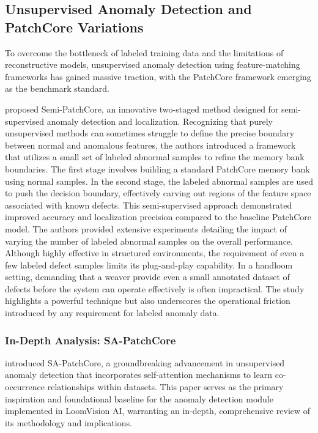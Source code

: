 \documentclass{ieeeaccess}
\begin{document}
\subsection{Unsupervised Anomaly Detection and PatchCore Variations}

To overcome the bottleneck of labeled training data and the limitations of reconstructive models, unsupervised anomaly detection using feature-matching frameworks has gained massive traction, with the PatchCore framework emerging as the benchmark standard.

\cite{b13} proposed Semi-PatchCore, an innovative two-staged method designed for semi-supervised anomaly detection and localization. Recognizing that purely unsupervised methods can sometimes struggle to define the precise boundary between normal and anomalous features, the authors introduced a framework that utilizes a small set of labeled abnormal samples to refine the memory bank boundaries. The first stage involves building a standard PatchCore memory bank using normal samples. In the second stage, the labeled abnormal samples are used to push the decision boundary, effectively carving out regions of the feature space associated with known defects. This semi-supervised approach demonstrated improved accuracy and localization precision compared to the baseline PatchCore model. The authors provided extensive experiments detailing the impact of varying the number of labeled abnormal samples on the overall performance. Although highly effective in structured environments, the requirement of even a few labeled defect samples limits its plug-and-play capability. In a handloom setting, demanding that a weaver provide even a small annotated dataset of defects before the system can operate effectively is often impractical. The study highlights a powerful technique but also underscores the operational friction introduced by any requirement for labeled anomaly data.

\subsubsection{In-Depth Analysis: SA-PatchCore}

\cite{b14} introduced SA-PatchCore, a groundbreaking advancement in unsupervised anomaly detection that incorporates self-attention mechanisms to learn co-occurrence relationships within datasets. This paper serves as the primary inspiration and foundational baseline for the anomaly detection module implemented in LoomVision AI, warranting an in-depth, comprehensive review of its methodology and implications.
\end{document}
